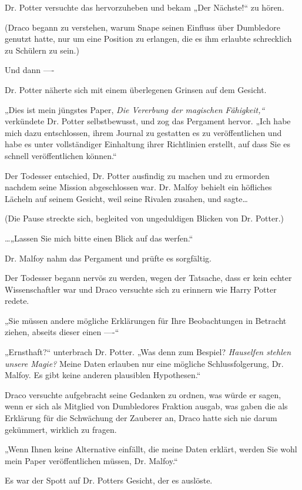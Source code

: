 {Dr. Potter versuchte das hervorzuheben und bekam „Der Nächste!“ zu hören.

(Draco begann zu verstehen, warum Snape seinen Einfluss über Dumbledore genutzt hatte, nur um eine Position zu erlangen, die es ihm erlaubte schrecklich zu Schülern zu sein.)

Und dann ----

Dr. Potter näherte sich mit einem überlegenen Grinsen auf dem Gesicht.

„Dies ist mein jüngstes Paper, \emph{Die Vererbung der magischen Fähigkeit,“} verkündete Dr. Potter selbstbewusst, und zog das Pergament hervor. „Ich habe mich dazu entschlossen, ihrem Journal zu gestatten es zu veröffentlichen und habe es unter vollständiger Einhaltung ihrer Richtlinien erstellt, auf dass Sie es schnell veröffentlichen können.“

Der Todesser entschied, Dr. Potter ausfindig zu machen und zu ermorden nachdem seine Mission abgeschlossen war. Dr. Malfoy behielt ein höfliches Lächeln auf seinem Gesicht, weil seine Rivalen zusahen, und sagte…

(Die Pause streckte sich, begleited von ungeduldigen Blicken von Dr. Potter.)

…„Lassen Sie mich bitte einen Blick auf das werfen.“

Dr. Malfoy nahm das Pergament und prüfte es sorgfältig.

Der Todesser begann nervös zu werden, wegen der Tatsache, dass er kein echter Wissenschaftler war und Draco versuchte sich zu erinnern wie Harry Potter redete.

„Sie müssen andere mögliche Erklärungen für Ihre Beobachtungen in Betracht ziehen, abseits dieser einen ----“

„Ernsthaft?“ unterbrach Dr. Potter. „Was denn zum Bespiel? \emph{Hauselfen stehlen unsere Magie?} Meine Daten erlauben nur eine mögliche Schlussfolgerung, Dr. Malfoy. Es gibt keine anderen plausiblen Hypothesen.“

Draco versuchte aufgebracht seine Gedanken zu ordnen, was würde er sagen, wenn er sich als Mitglied von Dumbledores Fraktion ausgab, was gaben die als Erklärung für die Schwächung der Zauberer an, Draco hatte sich nie darum gekümmert, wirklich zu fragen.

„Wenn Ihnen keine Alternative einfällt, die meine Daten erklärt, werden Sie wohl mein Paper veröffentlichen müssen, Dr. Malfoy.“

Es war der Spott auf Dr. Potters Gesicht, der es auslöste.

}
